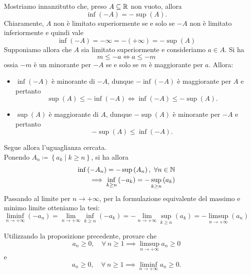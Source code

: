 \begin{solution}
Mostriamo innanzitutto che, preso $A\subseteq\mathbb{R}$ non vuoto, allora
\begin{equation*}
	\inf\left(-A\right)=-\sup\left(A\right).
\end{equation*}
Chiaramente, $A$ non è limitato superiormente se e solo se $-A$ non è limitato inferiormente e quindi vale
\begin{equation*}
	\inf\left(-A\right)=-\infty=-\left(+\infty\right)=-\sup\left(A\right)
\end{equation*}
Supponiamo allora che $A$ sia limitato superiormente e consideriamo $a\in A$. Si ha
\begin{equation*}
	m\leq -a\iff a\leq -m
\end{equation*}
ossia $-m$ è un minorante per $-A$ se e solo se $m$ è maggiorante per $a$. Allora:
\begin{itemize}
	\item $\inf\left(-A\right)$ è minorante di $-A$, dunque $-\inf\left(-A\right)$ è maggiorante per $A$ e pertanto
	\begin{equation*}
		\sup\left(A\right)\leq-\inf\left(-A\right)\iff\inf\left(-A\right)\leq-\sup\left(A\right).
	\end{equation*}
	\item $\sup\left(A\right)$ è maggiorante di $A$, dunque $-\sup\left(A\right)$ è minorante per $-A$ e pertanto
	\begin{equation*}
		-\sup\left(A\right)\leq\inf\left(-A\right).
	\end{equation*}
\end{itemize}
Segue allora l'uguaglianza cercata.\\
Ponendo	$A_n\coloneqq\left\{a_k\mid k\geq n\right\}$, si ha allora
\begin{align*}
	\inf\left(-A_n\right)=-\sup\left(A_n\right),\ \forall n\in\mathbb{N}\\
	\implies\inf_{k\geq n}\left(-a_k\right)=-\sup_{k\geq n}\left(a_k\right)
\end{align*}
Passando al limite per $n\to+\infty$, per la formulazione equivalente del massimo e minimo limite otteniamo la tesi:
\begin{equation*}
	\liminf_{n\to +\infty}\left(-a_n\right)=\lim_{n\to+\infty}\inf_{k\geq n}\left(-a_k\right)=-\lim_{n\to+\infty}\sup_{k\geq n}\left(a_k\right)=-\limsup_{n\to+\infty}\left(a_n\right)
\end{equation*}
\end{solution}
\begin{exercisewt}\label{limsuppermanenzadelsegno}
Utilizzando la proposizione precedente, provare che
\begin{equation*}
	a_n \geq 0,\quad \forall \ n\geq 1 \implies \limsup_{n\to +\infty} a_n\geq 0
\end{equation*}
e
\begin{equation*}
	a_n \geq 0,\quad \forall \ n\geq 1 \implies \liminf_{n\to +\infty} a_n \geq 0.
\end{equation*} 
\end{exercisewt}
